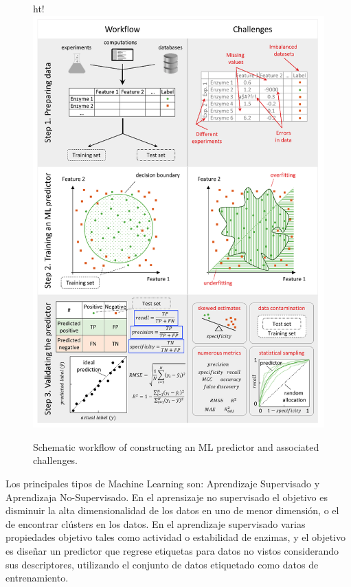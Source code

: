 \documentclass[12pt]{article}
\begin{document}
\begin{figure}{ht!}
\centering
\includegraphics[scale=0.45]{Figura2.png}
\caption{Schematic workflow of constructing an ML predictor and associated challenges. }
\label{Figura2}
\end{figure}

Los principales tipos de Machine Learning son: Aprendizaje Supervisado y Aprendizaja No-Supervisado. En el aprensizaje no supervisado el objetivo es disminuir la alta dimensionalidad de los datos en uno de menor dimensión, o el de encontrar clústers en los datos.  En el aprendizaje supervisado varias propiedades objetivo tales como actividad o estabilidad de enzimas,  y el objetivo es diseñar un predictor que regrese etiquetas para datos no vistos considerando sus descriptores,  utilizando el conjunto de datos etiquetado como datos de entrenamiento.
\end{document}
